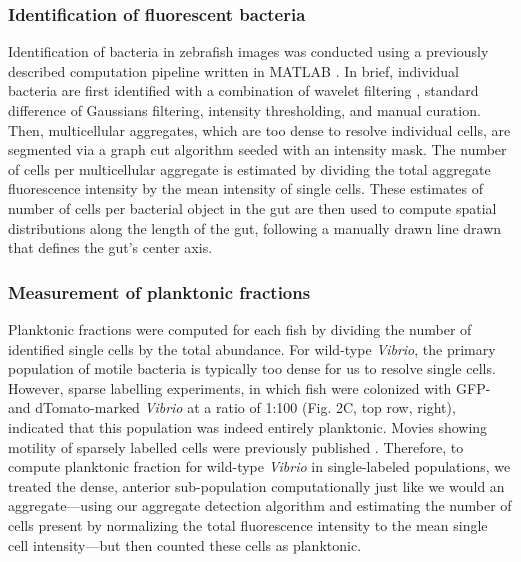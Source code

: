 \subsubsection{Identification of fluorescent bacteria}
Identification of bacteria in zebrafish images was conducted using a previously described computation pipeline written in MATLAB \cite{schlomann_bacterial_2018,jemielita_spatial_2014}. In brief, individual bacteria are first identified with a combination of wavelet filtering \cite{olivo-marin_extraction_2002}, standard difference of Gaussians filtering, intensity thresholding, and manual curation. Then, multicellular aggregates, which are too dense to resolve individual cells, are segmented via a graph cut algorithm \cite{boykov_experimental_2004} seeded with an intensity mask. The number of cells per multicellular aggregate is estimated by dividing the total aggregate fluorescence intensity by the mean intensity of single cells. These estimates of number of cells per bacterial object in the gut are then used to compute spatial distributions along the length of the gut, following a manually drawn line drawn that defines the gut's center axis.

\subsubsection{Measurement of planktonic fractions}
Planktonic fractions were computed for each fish by dividing the number of identified single cells by the total abundance. For wild-type \textit{Vibrio}, the primary population of motile bacteria is typically too dense for us to resolve single cells. However, sparse labelling experiments, in which fish were colonized with GFP- and dTomato-marked \textit{Vibrio} at a ratio of 1:100 (Fig. 2C, top row, right), indicated that this population was indeed entirely planktonic. Movies showing motility of sparsely labelled cells were previously published \cite{wiles_modernized_2018,schlomann_bacterial_2018}. Therefore, to compute planktonic fraction for wild-type \textit{Vibrio} in single-labeled populations, we treated the dense, anterior sub-population computationally just like we would an aggregate—using our aggregate detection algorithm and estimating the number of cells present by normalizing the total fluorescence intensity to the mean single cell intensity—but then counted these cells as planktonic.

